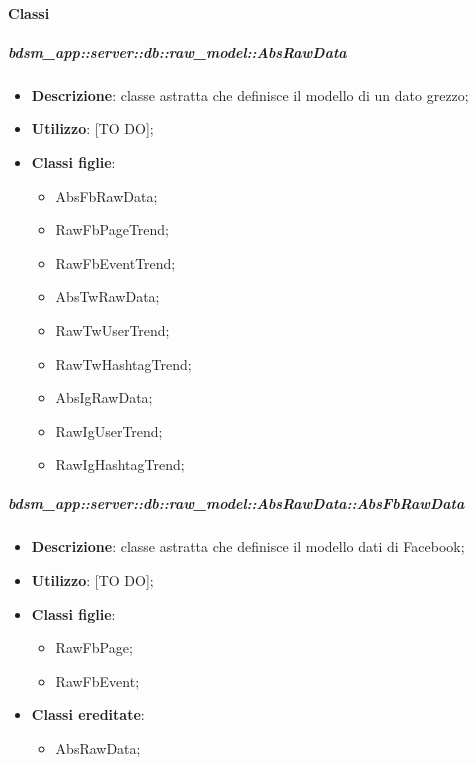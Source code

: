     \paragraph{Classi} %
    \subparagraph{bdsm\_app::server::db::raw\_model::AbsRawData} %
    \label{subp:bdsm_app_server_raw_model_AbsRawData}
      \begin{itemize}
        \item \textbf{Descrizione}: classe astratta che definisce il modello di un dato grezzo;
        \item \textbf{Utilizzo}: [TO DO];
        \item \textbf{Classi figlie}:
        \begin{itemize}
          \item AbsFbRawData;
          \item RawFbPageTrend;
          \item RawFbEventTrend;
          \item AbsTwRawData;
          \item RawTwUserTrend;
          \item RawTwHashtagTrend;
          \item AbsIgRawData;
          \item RawIgUserTrend;
          \item RawIgHashtagTrend;
        \end{itemize}
      \end{itemize}
    \subparagraph{bdsm\_app::server::db::raw\_model::AbsRawData::AbsFbRawData} %
    \label{subp:bdsm_app_server_raw_model_AbsRawData_AbsFbRawData}
      \begin{itemize}
        \item \textbf{Descrizione}: classe astratta che definisce il modello dati di Facebook;
        \item \textbf{Utilizzo}: [TO DO];
        \item \textbf{Classi figlie}:
        \begin{itemize}
          \item RawFbPage;
          \item RawFbEvent;
        \end{itemize}
        \item \textbf{Classi ereditate}:
        \begin{itemize}
          \item AbsRawData;
        \end{itemize}
      \end{itemize}
